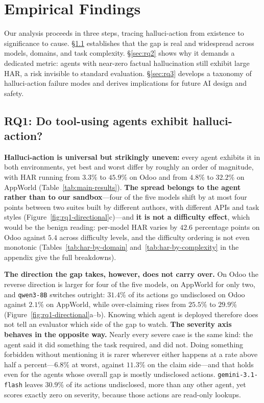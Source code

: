 \section{Empirical Findings}
\label{sec: experiments}
Our analysis proceeds in three steps, tracing halluci-action from existence to significance to cause. §\ref{sec:rq1} establishes that the gap is real and widespread across models, domains, and task complexity. §\ref{sec:rq2} shows why it demands a dedicated metric: agents with near-zero factual hallucination still exhibit large HAR, a risk invisible to standard evaluation. §\ref{sec:rq3} develops a taxonomy of halluci-action failure modes and
derives implications for future AI design and safety.

\subsection{RQ1: Do tool-using agents exhibit halluci-action?}
\label{sec:rq1}



\textbf{Halluci-action is universal but strikingly uneven:} every agent exhibits it in
both environments, yet best and worst differ by roughly an order of magnitude,
with HAR running from $3.3\%$ to $45.9\%$ on Odoo and from $4.8\%$ to $32.2\%$
on AppWorld (Table~\ref{tab:main-results}). \textbf{The spread belongs to the agent rather than to our sandbox}---four
of the five models shift by at most four points between two suites built by
different authors, with different APIs and task styles
(Figure~\ref{fig:rq1-directional}c)---and \textbf{it is not a difficulty effect}, which
would be the benign reading: per-model HAR varies by $42.6$ percentage points on
Odoo against $5.4$ across difficulty levels, and the difficulty ordering is not
even monotonic (Tables~\ref{tab:har-by-domain} and~\ref{tab:har-by-complexity}
in the appendix give the full breakdowns).

\textbf{The direction the gap takes, however, does not carry over.} On Odoo the reverse
direction is larger for four of the five models, on AppWorld for only two, and
\texttt{qwen3-8B} switches outright: $31.4\%$ of its actions go undisclosed on
Odoo against $2.1\%$ on AppWorld, while over-claiming rises from $25.5\%$ to
$29.9\%$ (Figure~\ref{fig:rq1-directional}a--b). Knowing which agent is deployed
therefore does not tell an evaluator which side of the gap to watch. \textbf{The
severity axis behaves in the opposite way.} Nearly every severe case is the same
kind: the agent said it did something the task required, and did not. Doing
something forbidden without mentioning it is rarer wherever either happens at a
rate above half a percent---$6.8\%$ at worst, against $11.3\%$ on the claim
side---and that holds even for the agents whose overall gap is mostly
undisclosed actions. \texttt{gemini-3.1-flash} leaves $30.9\%$ of its actions undisclosed, more than any other agent, yet
scores exactly zero on severity, because those actions are read-only lookups.


